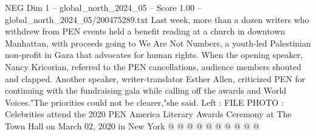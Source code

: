 \begin{textsample}{NEG Dim 1 – global\_north\_2024\_05 – Score 1.00 – global\_north\_2024\_05/200475289.txt}
Last week, more than a dozen writers who withdrew from PEN events held a benefit reading at a church in downtown Manhattan, with proceeds going to We Are Not Numbers, a youth-led Palestinian non-profit in Gaza that advocates for human rights.
When the opening speaker, Nancy Kricorian, referred to the PEN cancellations, audience members shouted and clapped.
Another speaker, writer-translator Esther Allen, criticized PEN for continuing with the fundraising gala while calling off the awards and World Voices."The priorities could not be clearer,"she said.
Left : FILE PHOTO : Celebrities attend the 2020 PEN America Literary Awards Ceremony at The Town Hall on March 02, 2020 in New York @ @ @ @ @ @ @ @ @ @

\end{textsample}
